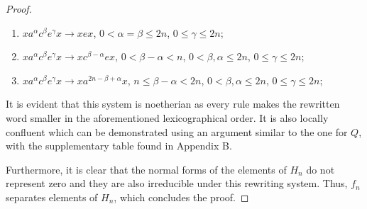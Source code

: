 \documentclass[10pt,a4paper]{amsart}
\begin{document}
\begin{proof}
\begin{enumerate}
\item $x a^\alpha c^\beta e^\gamma x\rightarrow x e x$, $0 <\alpha = \beta \le 2n$, $0\le \gamma \le 2n$;
\item $x a^\alpha c^\beta e^\gamma x\rightarrow x c^{\beta - \alpha} e x$, $0 < \beta - \alpha < n$, $0< \beta, \alpha  \le 2n$, $0\le \gamma \le 2n$;
\item $x a^\alpha c^\beta e^\gamma x\rightarrow x a^{2n - \beta + \alpha} x$, $n \le \beta - \alpha < 2n$, $0< \beta, \alpha  \le 2n$, $0\le \gamma \le 2n$;
\end{enumerate}

It is evident that this system is noetherian as every rule makes the rewritten word smaller in the aforementioned lexicographical order. It is also locally confluent which can be demonstrated using an argument similar to the one for $Q$, with the supplementary table found in Appendix B.

Furthermore, it is clear that the normal forms of the elements of $H_n$ do not represent zero and they are also irreducible under this rewriting system. Thus, $f_n$ separates elements of $H_n$, which concludes the proof.
\end{proof}
\end{document}
